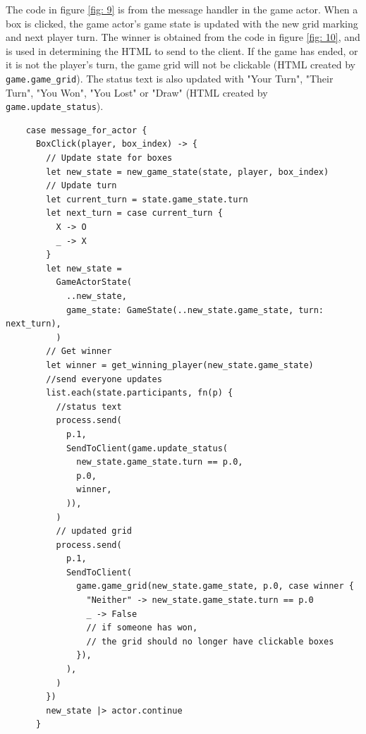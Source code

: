 \documentclass[]{final}
\begin{document}
\begin{minipage}[t]{18em}

  The code in figure \ref{fig: 9} is from the message handler in the game actor.
  When a box is clicked, the game actor's game state is updated with the new
  grid marking and next player turn. The winner is obtained from the code in
  figure \ref{fig: 10}, and is used in determining the HTML to send to the client.
  If the game has ended, or it is not the player's turn, the game grid will not be
  clickable (HTML created by \texttt{game.game\_grid}). The status text is also
  updated with "Your Turn", "Their Turn", "You Won",
  "You Lost" or "Draw" (HTML created by \texttt{game.update\_status}).

\end{minipage}
\hfill
\begin{minipage}[t]{20em}
  \begin{lstlisting}
    case message_for_actor {
      BoxClick(player, box_index) -> {
        // Update state for boxes
        let new_state = new_game_state(state, player, box_index)
        // Update turn
        let current_turn = state.game_state.turn
        let next_turn = case current_turn {
          X -> O
          _ -> X
        }
        let new_state =
          GameActorState(
            ..new_state,
            game_state: GameState(..new_state.game_state, turn: next_turn),
          )
        // Get winner
        let winner = get_winning_player(new_state.game_state)
        //send everyone updates
        list.each(state.participants, fn(p) {
          //status text
          process.send(
            p.1,
            SendToClient(game.update_status(
              new_state.game_state.turn == p.0,
              p.0,
              winner,
            )),
          )
          // updated grid
          process.send(
            p.1,
            SendToClient(
              game.game_grid(new_state.game_state, p.0, case winner {
                "Neither" -> new_state.game_state.turn == p.0
                _ -> False
                // if someone has won,
                // the grid should no longer have clickable boxes
              }),
            ),
          )
        })
        new_state |> actor.continue
      }
  \end{lstlisting}
  \label{fig: 9}
\end{minipage}

\newpage
\end{document}

